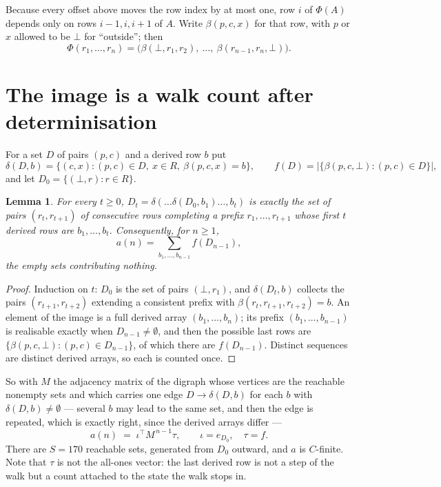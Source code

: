 \documentclass[11pt,a4paper]{article}
\theoremstyle{plain}
\newtheorem{lemma}[theorem]{Lemma}
\theoremstyle{definition}
\begin{document}
Because every offset above moves the row index by at most one, row $i$ of
$\Phi(A)$ depends only on rows $i-1,i,i+1$ of $A$. Write $\beta(p,c,x)$ for that row, with $p$
or $x$ allowed to be $\bot$ for ``outside''; then
\[
\Phi(r_1,\dots,r_n)=\bigl(\beta(\bot,r_1,r_2),\ \dots,\ \beta(r_{n-1},r_n,\bot)\bigr).
\]

\section{The image is a walk count after determinisation}

For a set $D$ of pairs $(p,c)$ and a derived row $b$ put
\[
\delta(D,b)=\{(c,x):(p,c)\in D,\ x\in R,\ \beta(p,c,x)=b\},\qquad
f(D)=\bigl|\{\beta(p,c,\bot):(p,c)\in D\}\bigr| ,
\]
and let $D_0=\{(\bot,r):r\in R\}$.

\begin{lemma}\label{lem:det}
For every $t\ge0$, $D_t=\delta(\dots\delta(D_0,b_1)\dots,b_t)$ is exactly the set of pairs
$(r_t,r_{t+1})$ of consecutive rows completing a prefix $r_1,\dots,r_{t+1}$ whose first $t$
derived rows are $b_1,\dots,b_t$. Consequently, for $n\ge1$,
\[
a(n)=\sum_{b_1,\dots,b_{n-1}}f(D_{n-1}),
\]
the empty sets contributing nothing.
\end{lemma}

\begin{proof}
Induction on $t$: $D_0$ is the set of pairs $(\bot,r_1)$, and $\delta(D_t,b)$ collects the
pairs $(r_{t+1},r_{t+2})$ extending a consistent prefix with
$\beta(r_t,r_{t+1},r_{t+2})=b$. An element of the image is a full derived array
$(b_1,\dots,b_n)$; its prefix $(b_1,\dots,b_{n-1})$ is realisable exactly when
$D_{n-1}\neq\emptyset$, and then the possible last rows are
$\{\beta(p,c,\bot):(p,c)\in D_{n-1}\}$, of which there are $f(D_{n-1})$. Distinct sequences
are distinct derived arrays, so each is counted once.
\end{proof}

So with $M$ the adjacency matrix of the digraph whose vertices are the reachable nonempty sets
and which carries one edge $D\to\delta(D,b)$ for each $b$ with $\delta(D,b)\neq\emptyset$ ---
several $b$ may lead to the same set, and then the edge is repeated, which is exactly right,
since the derived arrays differ ---
\[
a(n)\;=\;\iota^{\!\top}M^{\,n-1}\tau,\qquad \iota=e_{D_0},\quad \tau=f .
\]
There are $S=170$ reachable sets, generated from $D_0$ outward, and $a$ is $C$-finite.
Note that $\tau$ is not the all-ones vector: the last derived row is not a
step of the walk but a count attached to the state the walk stops in.
\end{document}
